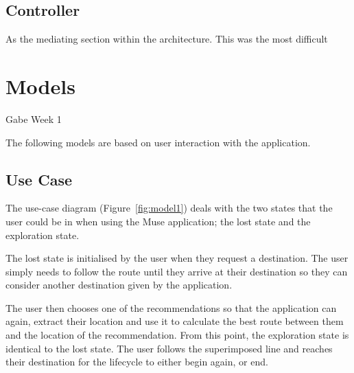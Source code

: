 \subsection{Controller}
As the mediating section within the architecture. This was the most difficult 

\section{Models}
Gabe Week 1

The following models are based on user interaction with the application.

\subsection{Use Case}

The use-case diagram (Figure~\ref{fig:model1}) deals with the two states that the user could be in when using the Muse application; the lost state and the exploration state.

The lost state is initialised by the user when they request a destination.   The user simply needs to follow the route until they arrive at their destination so  they can  consider another destination given by the  application.

 The user then chooses one of the recommendations so that the application can again, extract their location and use it to calculate the best route between them and the location of the recommendation. From this point, the exploration state is identical to the lost state. The user follows the superimposed line and reaches their destination for the lifecycle to either begin again, or end.

